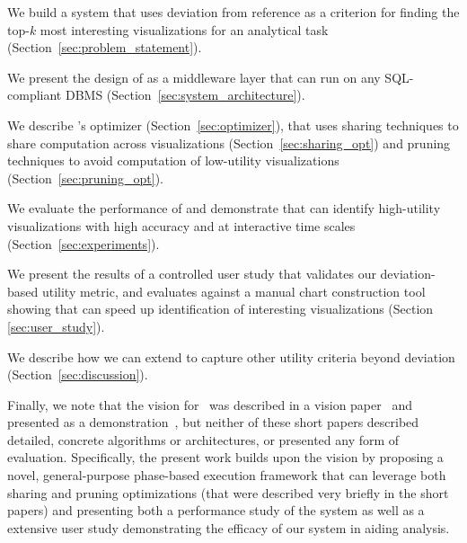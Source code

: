 \begin{denselist}
  \item We build a system that uses deviation from reference as a criterion for finding the
  top-$k$ most interesting visualizations for an analytical task (Section~\ref{sec:problem_statement}).

  \item We present the design of \SeeDB as a middleware layer that can run on any SQL-compliant DBMS 
  (Section~\ref{sec:system_architecture}).
  
  \item We describe \SeeDB's optimizer (Section~\ref{sec:optimizer}), that uses
  sharing techniques to share computation 
  across visualizations (Section~\ref{sec:sharing_opt}) and
  pruning techniques to avoid computation of low-utility visualizations
  (Section~\ref{sec:pruning_opt}).
  

  \item We evaluate the performance of \SeeDB and demonstrate that \SeeDB
  can identify high-utility visualizations with high accuracy and at interactive time scales
  (Section~\ref{sec:experiments}).

  \item We present the results of a controlled user study that validates our deviation-based 
  utility metric, and evaluates \SeeDB against a manual chart construction tool 
  showing that \SeeDB can speed up identification of interesting 
  visualizations (Section \ref{sec:user_study}).

  \item We describe how we can extend \SeeDB to capture other utility criteria
  beyond deviation (Section~\ref{sec:discussion}).
\end{denselist}

\noindent Finally, we note that the vision for \SeeDB\ was described 
in a vision paper~\cite{DBLP:conf/vldb/Parameswaran2013} and presented 
as a demonstration~\cite{DBLP:journals/pvldb/VartakMPP14}, 
but neither of these short papers described detailed, concrete algorithms or
architectures, or 
presented any form of evaluation.
Specifically, the present work builds 
upon the \SeeDB vision by proposing a novel, general-purpose phase-based
execution framework that can leverage both 
sharing and pruning optimizations (that were described very briefly
in the short papers)
and presenting both a performance study of the system as well as a extensive
user study demonstrating the efficacy of our system in aiding analysis.


